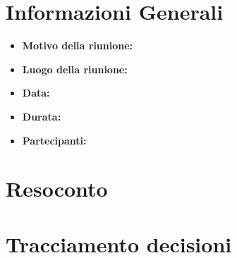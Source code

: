 \section{Informazioni Generali}
\begin{itemize}
	\item \textbf{Motivo della riunione:}
	\item \textbf{Luogo della riunione:}
	\item \textbf{Data:}
	\item \textbf{Durata:}
	\item \textbf{Partecipanti:}
	
\end{itemize}

\section{Resoconto}

\section{Tracciamento decisioni}

